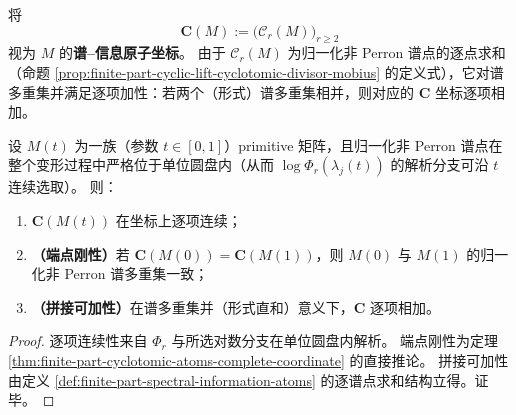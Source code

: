 \begin{definition}[谱--信息原子坐标与其加性]\label{def:finite-part-spectral-information-atoms}
将
\[
\mathbf{C}(M):=\bigl(\mathcal{C}_r(M)\bigr)_{r\ge2}
\]
视为 \(M\) 的\textbf{谱--信息原子坐标}。
由于 \(\mathcal{C}_r(M)\) 为归一化非 Perron 谱点的逐点求和（命题 \ref{prop:finite-part-cyclic-lift-cyclotomic-divisor-mobius} 的定义式），它对谱多重集并满足逐项加性：若两个（形式）谱多重集相并，则对应的 \(\mathbf{C}\) 坐标逐项相加。
\end{definition}

\begin{theorem}[同伦刚性与拼接可加性]\label{thm:finite-part-cyclotomic-atoms-homotopy-additive}
设 \(M(t)\) 为一族（参数 \(t\in[0,1]\)）primitive 矩阵，且归一化非 Perron 谱点在整个变形过程中严格位于单位圆盘内（从而 \(\log\Phi_r(\lambda_j(t))\) 的解析分支可沿 \(t\) 连续选取）。
则：
\begin{enumerate}
  \item \(\mathbf{C}(M(t))\) 在坐标上逐项连续；
  \item \textbf{（端点刚性）}若 \(\mathbf{C}(M(0))=\mathbf{C}(M(1))\)，则 \(M(0)\) 与 \(M(1)\) 的归一化非 Perron 谱多重集一致；
  \item \textbf{（拼接可加性）}在谱多重集并（形式直和）意义下，\(\mathbf{C}\) 逐项相加。
\end{enumerate}
\end{theorem}
\begin{proof}
逐项连续性来自 \(\Phi_r\) 与所选对数分支在单位圆盘内解析。
端点刚性为定理 \ref{thm:finite-part-cyclotomic-atoms-complete-coordinate} 的直接推论。
拼接可加性由定义 \ref{def:finite-part-spectral-information-atoms} 的逐谱点求和结构立得。证毕。
\end{proof}
